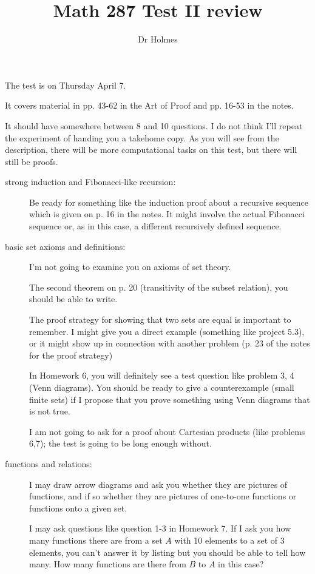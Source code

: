 \documentclass[12pt]{article}
\title{Math 287 Test II review}
\author{Dr Holmes}
\begin{document}
\maketitle

The test is on Thursday April 7.

It covers material in pp.  43-62 in the Art of Proof and pp. 16-53 in the notes.

It should have somewhere between 8 and 10 questions.  I do not think I'll repeat the experiment of handing you a takehome copy.  As you will see from the description, there will be more computational tasks on this test, but there will still be proofs.

\begin{description}

\item[strong induction and Fibonacci-like recursion:]  Be ready for something like the induction proof about a recursive sequence which is given on p. 16 in the notes.  It might involve the actual Fibonacci sequence or, as in this case, a different recursively defined sequence.

\item[basic set axioms and definitions:]  I'm not going to examine you on axioms of set theory.

The second theorem on p. 20 (transitivity of the subset relation), you should be able to write.

The proof strategy for showing that two sets are equal is important to remember.  I might give you a direct example (something like project 5.3), or it might show up in connection with another problem (p. 23 of the notes for the proof strategy)

In Homework 6, you will definitely see a test question like problem 3, 4 (Venn diagrams).  You should be ready to give a counterexample (small finite sets) if I propose that you prove something using Venn diagrams that is not true.

I am not going to ask for a proof about Cartesian products (like problems 6,7);  the test is going to be long enough without.

\item[functions and relations:]

I may draw arrow diagrams and ask you whether they are pictures of functions, and if so whether they are pictures of one-to-one functions or functions onto a given set.

I may ask questions like question 1-3 in Homework 7.  If I ask you how many functions there are from a set $A$ with 10 elements to a set of 3 elements, you can't answer it by listing but you should be able to tell how many.  How many functions are there from $B$ to $A$ in this case?


\end{description}
\end{document}
